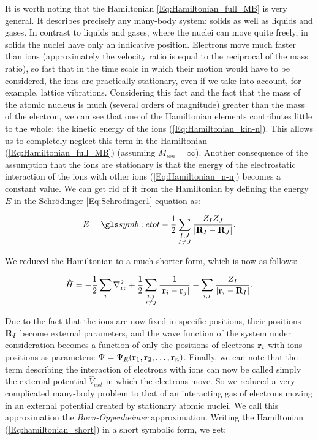 It is worth noting that the Hamiltonian \ref{Eq:Hamiltonian_full_MB} is very general.
It describes precisely any many-body system: solids as well as liquids and gases.
In contrast to liquids and gases, where the nuclei can move quite freely, in solids the nuclei have only an indicative position.
Electrons move much faster than ions (approximately the velocity ratio is equal to the reciprocal of the mass ratio), so fast that in the time scale in which their motion would have to be considered, the ions are practically stationary, even if we take into account, for example, lattice vibrations.
Considering this fact and the fact that the mass of the atomic nucleus is much (several orders of magnitude) greater than the mass of the electron, we can see that one of the Hamiltonian elements contributes little to the whole: the kinetic energy of the ions (\ref{Eq:Hamiltonian_kin-n}).
This allows us to completely neglect this term in the Hamiltonian (\ref{Eq:Hamiltonian_full_MB}) (assuming $M_{ion} = \infty$).
Another consequence of the assumption that the ions are stationary is that the energy of the electrostatic interaction of the ions with other ions (\ref{Eq:Hamiltonian_n-n}) becomes a constant value. We can get rid of it from the Hamiltonian by defining the energy $E$ in the Schr\"odinger \ref{Eq:Schrodinger1} equation as:

\begin{equation}
    \label{Eq:Born_Oppenheimer_Energy}
    E=\Etot-\frac{1}{2}\sum_{\substack{I,J\\I\neq J}}\frac{Z_IZ_J}{|\bb{R}_I-\bb{R}_J|}.
\end{equation}

We reduced the Hamiltonian to a much shorter form, which is now as follows: 

\begin{equation}
    \label{Eq:hamiltonian_short}
    \begin{aligned}
        \hat{H}=-\frac{1}{2}\sum_{i}\nabla^2_{\mathbf{r}_i}+\frac{1}{2}\sum_{\substack{i,j\\i\neq j}}\frac{1}{|\mathbf{r}_i-\mathbf{r}_j|}-\sum_{i,I}\frac{Z_I}{|\mathbf{r}_i-\mathbf{R}_I|}.
    \end{aligned}
\end{equation}

Due to the fact that the ions are now fixed in specific positions, their positions $\mathbf{R}_I$ become external parameters, and the wave function of the system under consideration becomes a function of only the positions of electrons $\mathbf{r}_i$ with ions positions as parameters: $\Psi = \Psi_R(\mathbf{r}_1, \mathbf{r}_2, \dots, \mathbf{r}_n)$.
Finally, we can note that the term describing the interaction of electrons with ions can now be called simply the external potential $\hat{V}_{ext}$ in which the electrons move. So we reduced a very complicated many-body problem to that of an interacting gas of electrons moving in an external potential created by stationary atomic nuclei.
We call this approximation the \emph{Born-Oppenheimer} approximation. Writing the Hamiltonian (\ref{Eq:hamiltonian_short}) in a short symbolic form, we get:

